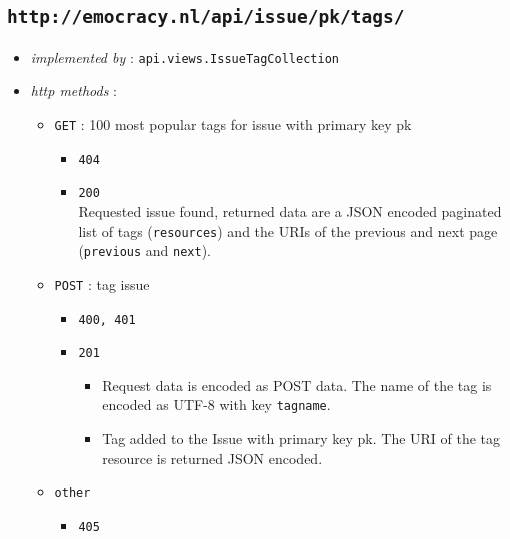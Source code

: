 \documentclass[a4paper]{report}
\begin{document}
\subsection{\texttt{http://emocracy.nl/api/issue/\textsf{pk}/tags/}}
\begin{itemize}
    \item{\textsl{implemented by} : \texttt{api.views.IssueTagCollection}}
    \item{\textsl{http methods} :
        \begin{itemize}
            \item{\texttt{GET} : 100 most popular tags for issue with primary key \textsf{pk}
                \begin{itemize}
                    \item{\texttt{404}}
                    \item{\texttt{200}\\
                    Requested issue found, returned data are a JSON encoded
                    paginated list of tags (\texttt{resources}) and the URIs of 
                    the previous and next page (\texttt{previous} and \texttt{next}).
                    }
                \end{itemize}
            }
            \item{\texttt{POST} : tag issue 
                \begin{itemize}
                    \item{\texttt{400, 401}}
                    \item{\texttt{201}\\
                    \begin{itemize}
                    \item{Request data is encoded as POST data. The name of the 
                    tag is encoded as UTF-8 with key \texttt{tagname}.}
                    \item{Tag added to the Issue with primary key \textsf{pk}. The 
                    URI of the tag resource is returned JSON encoded.}
                    \end{itemize}
                    }
                \end{itemize}
            }
            \item{\texttt{other}
                \begin{itemize}
                    \item{\texttt{405}}
                \end{itemize}
            }
        \end{itemize}
    }
\end{itemize}
\end{document}
